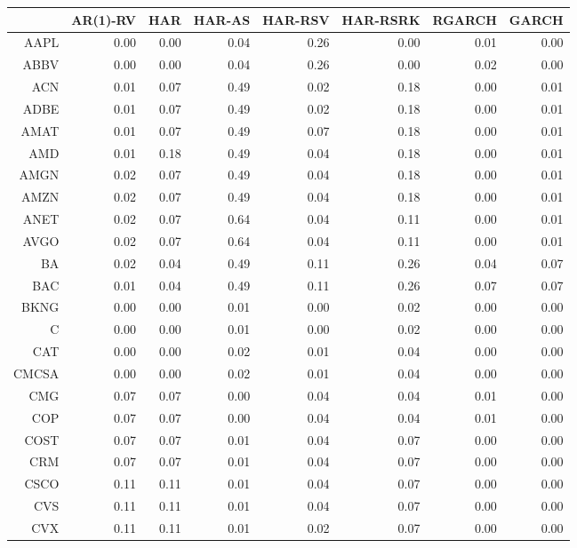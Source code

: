 \begin{table}[ht]
\centering
\begin{tabular}{rrrrrrrr}
  \hline
 & AR(1)-RV & HAR & HAR-AS & HAR-RSV & HAR-RSRK & RGARCH & GARCH \\ 
  \hline
AAPL & 0.00 & 0.00 & 0.04 & 0.26 & 0.00 & 0.01 & 0.00 \\ 
  ABBV & 0.00 & 0.00 & 0.04 & 0.26 & 0.00 & 0.02 & 0.00 \\ 
  ACN & 0.01 & 0.07 & 0.49 & 0.02 & 0.18 & 0.00 & 0.01 \\ 
  ADBE & 0.01 & 0.07 & 0.49 & 0.02 & 0.18 & 0.00 & 0.01 \\ 
  AMAT & 0.01 & 0.07 & 0.49 & 0.07 & 0.18 & 0.00 & 0.01 \\ 
  AMD & 0.01 & 0.18 & 0.49 & 0.04 & 0.18 & 0.00 & 0.01 \\ 
  AMGN & 0.02 & 0.07 & 0.49 & 0.04 & 0.18 & 0.00 & 0.01 \\ 
  AMZN & 0.02 & 0.07 & 0.49 & 0.04 & 0.18 & 0.00 & 0.01 \\ 
  ANET & 0.02 & 0.07 & 0.64 & 0.04 & 0.11 & 0.00 & 0.01 \\ 
  AVGO & 0.02 & 0.07 & 0.64 & 0.04 & 0.11 & 0.00 & 0.01 \\ 
  BA & 0.02 & 0.04 & 0.49 & 0.11 & 0.26 & 0.04 & 0.07 \\ 
  BAC & 0.01 & 0.04 & 0.49 & 0.11 & 0.26 & 0.07 & 0.07 \\ 
  BKNG & 0.00 & 0.00 & 0.01 & 0.00 & 0.02 & 0.00 & 0.00 \\ 
  C & 0.00 & 0.00 & 0.01 & 0.00 & 0.02 & 0.00 & 0.00 \\ 
  CAT & 0.00 & 0.00 & 0.02 & 0.01 & 0.04 & 0.00 & 0.00 \\ 
  CMCSA & 0.00 & 0.00 & 0.02 & 0.01 & 0.04 & 0.00 & 0.00 \\ 
  CMG & 0.07 & 0.07 & 0.00 & 0.04 & 0.04 & 0.01 & 0.00 \\ 
  COP & 0.07 & 0.07 & 0.00 & 0.04 & 0.04 & 0.01 & 0.00 \\ 
  COST & 0.07 & 0.07 & 0.01 & 0.04 & 0.07 & 0.00 & 0.00 \\ 
  CRM & 0.07 & 0.07 & 0.01 & 0.04 & 0.07 & 0.00 & 0.00 \\ 
  CSCO & 0.11 & 0.11 & 0.01 & 0.04 & 0.07 & 0.00 & 0.00 \\ 
  CVS & 0.11 & 0.11 & 0.01 & 0.04 & 0.07 & 0.00 & 0.00 \\ 
  CVX & 0.11 & 0.11 & 0.01 & 0.02 & 0.07 & 0.00 & 0.00 \\ 

\end{tabular}
\end{table}

